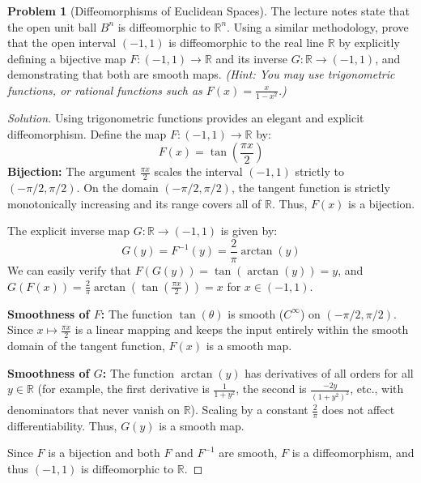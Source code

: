 \documentclass[12pt, a4paper]{article}
\theoremstyle{definition}
\newtheorem{problem}{Problem}
\newenvironment{solution}
  {\renewcommand\qedsymbol{$\blacksquare$}\begin{proof}[Solution]}
  {\end{proof}}
\newcommand{\RR}{\mathbb{R}}
\begin{document}
\begin{problem}[Diffeomorphisms of Euclidean Spaces]
The lecture notes state that the open unit ball $B^n$ is diffeomorphic to $\RR^n$.
Using a similar methodology, prove that the open interval $(-1, 1)$ is diffeomorphic to the real line $\RR$ by explicitly defining a bijective map $F: (-1, 1) \to \RR$ and its inverse $G: \RR \to (-1, 1)$, and demonstrating that both are smooth maps. 
\textit{(Hint: You may use trigonometric functions, or rational functions such as $F(x) = \frac{x}{1-x^2}$.)}
\end{problem}
\begin{solution}
Using trigonometric functions provides an elegant and explicit diffeomorphism. 
Define the map $F: (-1, 1) \to \RR$ by:
\[
F(x) = \tan\left(\frac{\pi x}{2}\right)
\]
\textbf{Bijection:} 
The argument $\frac{\pi x}{2}$ scales the interval $(-1, 1)$ strictly to $(-\pi/2, \pi/2)$. On the domain $(-\pi/2, \pi/2)$, the tangent function is strictly monotonically increasing and its range covers all of $\RR$. Thus, $F(x)$ is a bijection.

The explicit inverse map $G: \RR \to (-1, 1)$ is given by:
\[
G(y) = F^{-1}(y) = \frac{2}{\pi} \arctan(y)
\]
We can easily verify that $F(G(y)) = \tan(\arctan(y)) = y$, and $G(F(x)) = \frac{2}{\pi}\arctan(\tan(\frac{\pi x}{2})) = x$ for $x \in (-1, 1)$.

\textbf{Smoothness of $F$:} 
The function $\tan(\theta)$ is smooth ($C^\infty$) on $(-\pi/2, \pi/2)$. Since $x \mapsto \frac{\pi x}{2}$ is a linear mapping and keeps the input entirely within the smooth domain of the tangent function, $F(x)$ is a smooth map.

\textbf{Smoothness of $G$:} 
The function $\arctan(y)$ has derivatives of all orders for all $y \in \RR$ (for example, the first derivative is $\frac{1}{1+y^2}$, the second is $\frac{-2y}{(1+y^2)^2}$, etc., with denominators that never vanish on $\RR$). Scaling by a constant $\frac{2}{\pi}$ does not affect differentiability. Thus, $G(y)$ is a smooth map.

Since $F$ is a bijection and both $F$ and $F^{-1}$ are smooth, $F$ is a diffeomorphism, and thus $(-1, 1)$ is diffeomorphic to $\RR$.
\end{solution}

\vfill\newpage
\end{document}
